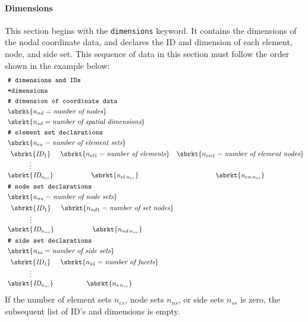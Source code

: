 \paragraph{Dimensions}
\label{section.TahoeII.dimensions}
This section begins with the \texttt{dimensions} keyword.
It contains the dimensions of the nodal coordinate data, and
declares the ID and dimension of each element, node, and side set.
This sequence of data in this 
section must follow the order shown in the example below:
\begin{align}
& \texttt{\# dimensions and IDs} \notag \\\
& \texttt{*dimensions} \notag \\
& \texttt{\# dimension of coordinate data} \notag \\
& \sbrkt{n_{nd}=\textit{number of nodes}} \notag \\
& \sbrkt{n_{sd}=\textit{number of spatial dimensions}} \notag \\
& \texttt{\# element set declarations} \notag \\
& \sbrkt{n_{es}=\textit{number of element sets}} \notag \\
& \begin{matrix}
\sbrkt{\textit{ID}_{1}} & 
\sbrkt{n_{el1} = \textit{number of elements}} & 
\sbrkt{n_{en1} = \textit{number of element nodes}} \\
\vdots \\
\sbrkt{\textit{ID}_{n_{es}}} & 
\sbrkt{n_{el\,n_{es}}} & \sbrkt{n_{en\,n_{es}}}
\end{matrix} \notag \\
& \texttt{\# node set declarations} \notag \\
& \sbrkt{n_{ns} = \textit{number of node sets}} \notag \\
& \begin{matrix}
\sbrkt{\textit{ID}_{1}} & \sbrkt{n_{nd1} = \textit{number of set nodes}} \\
\vdots \\
\sbrkt{\textit{ID}_{n_{ns}}} & \sbrkt{n_{nd\,n_{ns}}}
\end{matrix} \notag \\
& \texttt{\# side set declarations} \notag \\
& \sbrkt{n_{ss} = \textit{number of side sets}} \notag \\
& \begin{matrix}
\sbrkt{\textit{ID}_{1}} & \sbrkt{n_{s1} = \textit{number of facets}} \\
\vdots \\
\sbrkt{\textit{ID}_{n_{ss}}} & \sbrkt{n_{s\,n_{ss}}}
\end{matrix} \notag
\end{align}
If the number of element sets $n_{es}$, node sets $n_{ns}$, or side sets 
$n_{ss}$ is zero, the subsequent list of ID's and dimensions is empty. 

